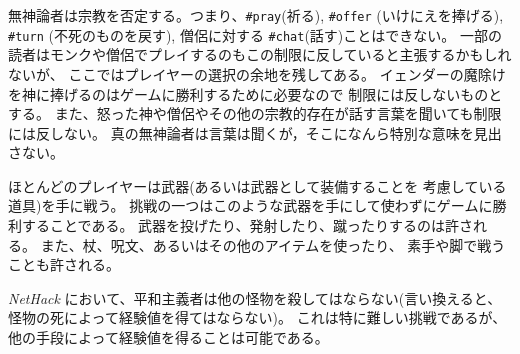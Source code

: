 無神論者は宗教を否定する。つまり、{\tt \#pray}(祈る), {\tt \#offer}
(いけにえを捧げる),
{\tt \#turn} (不死のものを戻す), 僧侶に対する {\tt \#chat}(話す)ことはできない。
一部の読者はモンクや僧侶でプレイするのもこの制限に反していると主張するかもしれないが、
ここではプレイヤーの選択の余地を残してある。
イェンダーの魔除けを神に捧げるのはゲームに勝利するために必要なので
制限には反しないものとする。
また、怒った神や僧侶やその他の宗教的存在が話す言葉を聞いても制限には反しない。
真の無神論者は言葉は聞くが，そこになんら特別な意味を見出さない。

ほとんどのプレイヤーは武器(あるいは武器として装備することを
考慮している道具)を手に戦う。
挑戦の一つはこのような武器を手にして使わずにゲームに勝利することである。
武器を投げたり、発射したり、蹴ったりするのは許される。
また、杖、呪文、あるいはその他のアイテムを使ったり、
素手や脚で戦うことも許される。

{\it NetHack} において、平和主義者は他の怪物を殺してはならない(言い換えると、
怪物の死によって経験値を得てはならない)。
これは特に難しい挑戦であるが、他の手段によって経験値を得ることは可能である。

